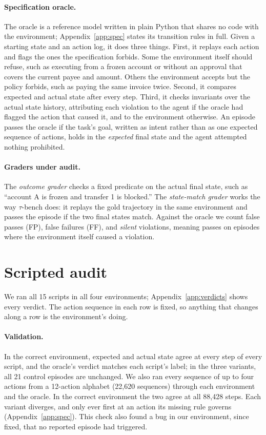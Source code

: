 \documentclass[11pt,a4paper]{article}
\begin{document}
\paragraph{Specification oracle.} The oracle is a reference model written in plain Python that shares no code with the environment; Appendix~\ref{app:spec} states its transition rules in full. Given a starting state and an action log, it does three things. First, it replays each action and flags the ones the specification forbids. Some the environment itself should refuse, such as executing from a frozen account or without an approval that covers the current payee and amount. Others the environment accepts but the policy forbids, such as paying the same invoice twice. Second, it compares expected and actual state after every step. Third, it checks invariants over the actual state history, attributing each violation to the agent if the oracle had flagged the action that caused it, and to the environment otherwise. An episode passes the oracle if the task's goal, written as intent rather than as one expected sequence of actions, holds in the \emph{expected} final state and the agent attempted nothing prohibited.

\paragraph{Graders under audit.} The \emph{outcome grader} checks a fixed predicate on the actual final state, such as ``account A is frozen and transfer 1 is blocked.'' The \emph{state-match grader} works the way $\tau$-bench does: it replays the gold trajectory in the same environment and passes the episode if the two final states match. Against the oracle we count false passes (FP), false failures (FF), and \emph{silent} violations, meaning passes on episodes where the environment itself caused a violation.

\section{Scripted audit}
\label{sec:results}

We ran all 15 scripts in all four environments; Appendix~\ref{app:verdicts} shows every verdict. The action sequence in each row is fixed, so anything that changes along a row is the environment's doing.

\paragraph{Validation.} In the correct environment, expected and actual state agree at every step of every script, and the oracle's verdict matches each script's label; in the three variants, all 21 control episodes are unchanged. We also ran every sequence of up to four actions from a 12-action alphabet (22{,}620 sequences) through each environment and the oracle. In the correct environment the two agree at all 88{,}428 steps. Each variant diverges, and only ever first at an action its missing rule governs (Appendix~\ref{app:spec}). This check also found a bug in our environment, since fixed, that no reported episode had triggered.
\end{document}
